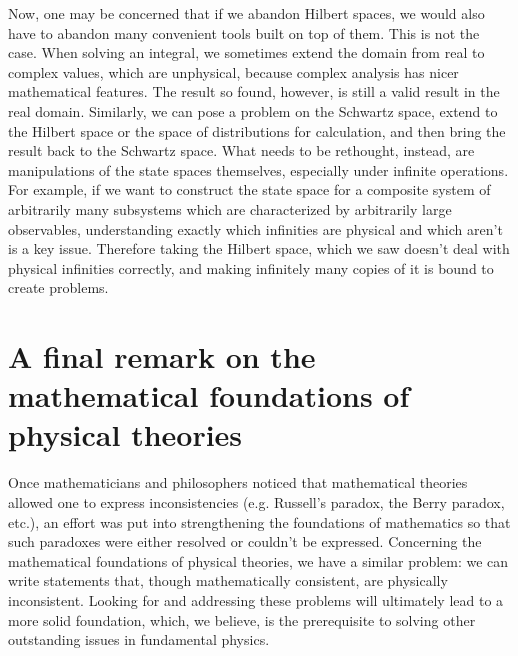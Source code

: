 \documentclass[10pt,twocolumn, nofootinbib]{revtex4-2}
\begin{document}
Now, one may be concerned that if we abandon Hilbert spaces, we would also have to abandon many convenient tools built on top of them. This is not the case. When solving an integral, we sometimes extend the domain from real to complex values, which are unphysical, because complex analysis has nicer mathematical features. The result so found, however, is still a valid result in the real domain. Similarly, we can pose a problem on the Schwartz space, extend to the Hilbert space or the space of distributions for calculation, and then bring the result back to the Schwartz space. What needs to be rethought, instead, are manipulations of the state spaces themselves, especially under infinite operations. For example, if we want to construct the state space for a composite system of arbitrarily many subsystems which are characterized by arbitrarily large observables, understanding exactly which infinities are physical and which aren't is a key issue. Therefore taking the Hilbert space, which we saw doesn't deal with physical infinities correctly, and making infinitely many copies of it is bound to create problems.


\section{A final remark on the mathematical foundations of physical theories}

Once mathematicians and philosophers noticed that mathematical theories allowed one to express inconsistencies (e.g. Russell's paradox, the Berry paradox, etc.), an effort was put into strengthening the foundations of mathematics so that such paradoxes were either resolved or couldn't be expressed. Concerning the mathematical foundations of physical theories, we have a similar problem: we can write statements that, though mathematically consistent, are physically inconsistent. Looking for and addressing these problems will ultimately lead to a more solid foundation, which, we believe, is the prerequisite to solving other outstanding issues in fundamental physics. %
\end{document}
